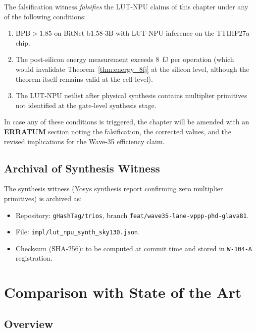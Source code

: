The falsification witness \emph{falsifies} the LUT-NPU claims of this
chapter under any of the following conditions:

\begin{enumerate}
  \item \(\mathrm{BPB} > 1.85\) on BitNet b1.58-3B with LUT-NPU inference
        on the TTIHP27a chip.
  \item The post-silicon energy measurement exceeds 8~fJ per operation
        (which would invalidate Theorem~\ref{thm:energy_8fj} at the
        silicon level, although the theorem itself remains valid at the
        cell level).
  \item The LUT-NPU netlist after physical synthesis contains
        multiplier primitives not identified at the gate-level synthesis
        stage.
\end{enumerate}

In case any of these conditions is triggered, the chapter will be amended
with an \textbf{ERRATUM} section noting the falsification, the corrected
values, and the revised implications for the Wave-35 efficiency claim.

\subsection{Archival of Synthesis Witness}
\label{subsec:synthesis_witness}

The synthesis witness (Yosys synthesis report confirming zero multiplier
primitives) is archived as:
\begin{itemize}
  \item Repository: \texttt{gHashTag/trios}, branch
        \texttt{feat/wave35-lane-vppp-phd-glava81}.
  \item File: \texttt{impl/lut\_npu\_synth\_sky130.json}.
  \item Checksum (SHA-256): to be computed at commit time and stored in
        \texttt{W-104-A} registration.
\end{itemize}

\section{Comparison with State of the Art}
\label{sec:sota}

\subsection{Overview}
\label{subsec:sota_overview}

